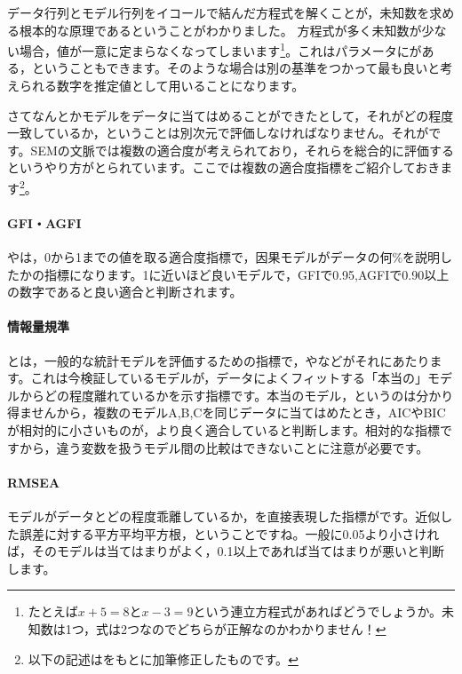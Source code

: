 \documentclass{ltjsbook}
\begin{document}
データ行列とモデル行列をイコールで結んだ方程式を解くことが，未知数を求める根本的な原理であるということがわかりました。
方程式が多く未知数が少ない場合，値が一意に定まらなくなってしまいます\footnote{たとえば$x+5=8$と$x-3=9$という連立方程式があればどうでしょうか。未知数は1つ，式は2つなのでどちらが正解なのかわかりません！}。これはパラメータにがある，ということもできます。そのような場合は別の基準をつかって最も良いと考えられる数字を推定値として用いることになります。

さてなんとかモデルをデータに当てはめることができたとして，それがどの程度一致しているか，ということは別次元で評価しなければなりません。それがです。SEMの文脈では複数の適合度が考えられており，それらを総合的に評価するというやり方がとられています。ここでは複数の適合度指標をご紹介しておきます\footnote{以下の記述は\textcite{Kosugi2014Mplus}をもとに加筆修正したものです。}。

\paragraph{GFI・AGFI} やは，0から1までの値を取る適合度指標で，因果モデルがデータの何\%を説明したかの指標になります。1に近いほど良いモデルで，GFIで0.95,AGFIで0.90以上の数字であると良い適合と判断されます。

\paragraph{情報量規準}
とは，一般的な統計モデルを評価するための指標で，やなどがそれにあたります。これは今検証しているモデルが，データによくフィットする「本当の」モデルからどの程度離れているかを示す指標です。本当のモデル，というのは分かり得ませんから，複数のモデルA,B,Cを同じデータに当てはめたとき，AICやBICが相対的に小さいものが，より良く適合していると判断します。相対的な指標ですから，違う変数を扱うモデル間の比較はできないことに注意が必要です。
\paragraph{RMSEA}
モデルがデータとどの程度乖離しているか，を直接表現した指標がです。近似した誤差に対する平方平均平方根，ということですね。一般に0.05より小さければ，そのモデルは当てはまりがよく，0.1以上であれば当てはまりが悪いと判断します。
\end{document}
